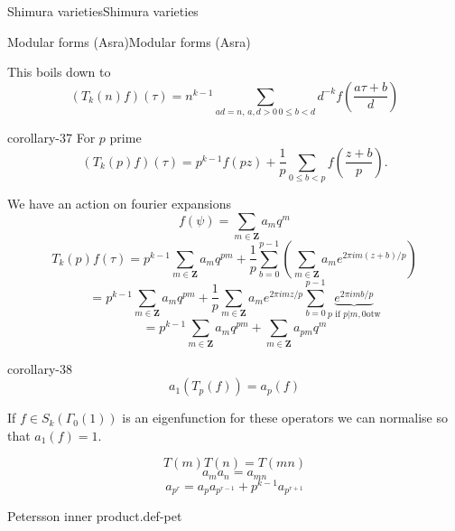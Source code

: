 \documentclass[10pt,]{book}
\numberwithin{equation}{section}
\newcommand{\ZZ}{\mathbf{Z}}
\newcommand{\lt}{<}
\newcommand{\gt}{>}
\begin{document}
\begin{chapterptx}{Shimura varieties}{}{Shimura varieties}{}{}
\begin{sectionptx}{Modular forms (Asra)}{}{Modular forms (Asra)}{}{}
\par
\hypertarget{p-1081}{}%
This boils down to%
\begin{equation*}
(T_k(n) f)(\tau) = n^{k-1}  \sum_{ ad= n,\, a,d\gt 0\, 0\le b \lt d} d^{-k} f\left( \frac{ a\tau +b}{d}\right)
\end{equation*}
%
\begin{corollary}{}{}{corollary-37}%
\hypertarget{p-1082}{}%
For \(p \) prime%
\begin{equation*}
(T_k(p) f)(\tau) = p^{k-1}f(pz) +\frac 1p \sum_{0 \le b  \lt p} f\left( \frac {z + b}{p} \right)\text{.}
\end{equation*}
%
\end{corollary}
\hypertarget{p-1083}{}%
We have an action on fourier expansions%
\begin{equation*}
f(\psi) = \sum_{m\in \ZZ} a_m q^m
\end{equation*}
%
\begin{equation*}
T_k(p)f(\tau) = p^{k-1} \sum_{m\in \ZZ} a_m q^{pm} + \frac{1}{p} \sum_{b=0}^{p-1}  \left( \sum_{m\in \ZZ} a_m e^{2\pi i m (z+b)/p}\right)
\end{equation*}
%
\begin{equation*}
= p^{k-1} \sum_{m\in \ZZ} a_m q^{pm} + \frac{1}{p}  \sum_{m\in \ZZ} a_me^{2\pi i m z/p} \sum_{b=0}^{p-1} \underbrace{e^{2\pi i m b/p}}_{p\text{ if }p|m,0\text{otw}}
\end{equation*}
%
\begin{equation*}
= p^{k-1} \sum_{m\in \ZZ} a_m q^{pm} +\sum_{m\in \ZZ} a_{pm}q^m
\end{equation*}
%
\begin{corollary}{}{}{corollary-38}%
\hypertarget{p-1084}{}%
%
\begin{equation*}
a_1(T_p(f)) = a_p(f)
\end{equation*}
%
\end{corollary}
\hypertarget{p-1085}{}%
If \(f\in S_k(\Gamma_0(1))\) is an eigenfunction for these operators we can normalise so that \(a_1(f) = 1\).%
\par
\hypertarget{p-1086}{}%
%
\begin{equation*}
T(m)T(n) = T(mn)
\end{equation*}
%
\begin{equation*}
a_ma_n = a_{mn}
\end{equation*}
%
\begin{equation*}
a_{p^r} = a_p a_{p^{r-1}} + p^{k-1} a_{p^{r+1}}
\end{equation*}
%
\begin{definition}{Petersson inner product.}{def-pet}%

\end{definition}
\end{sectionptx}
\end{chapterptx}
\end{document}
